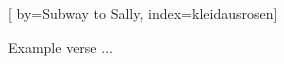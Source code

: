
[%
    by={Subway to Sally},
    index={kleidausrosen}]


    \label{kleidausrosen}

    \beginverse
        Example verse ...
    \endverse
\endsong
